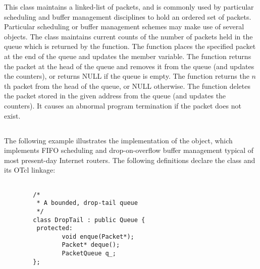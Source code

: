 This class maintains a linked-list of packets, and is commonly
used by particular scheduling and buffer management disciplines
to hold an ordered set of packets.
Particular scheduling or buffer management schemes may make
use of several  objects.
The  class maintains current counts of the number of
packets held in the queue which is returned by the 
function.
The  function places the specified packet at the end of
the queue and updates the  member variable.
The  function returns the packet at the head of the
queue and removes it from the queue (and updates the counters), or
returns NULL if the queue is empty.
The  function returns the $n$th packet from the head
of the queue, or NULL otherwise.
The  function deletes the packet stored in the given address
from the queue (and updates the counters).
It causes an abnormal program termination if the packet does not exist.

\subsection{}

The following example illustrates the implementation of the
 object,
which implements FIFO scheduling and
drop-on-overflow buffer management typical of most present-day
Internet routers.
The following definitions declare the class and its OTcl linkage:
\begin{small}
\begin{verbatim}

        /*
         * A bounded, drop-tail queue
         */
        class DropTail : public Queue {
         protected:
                void enque(Packet*);
                Packet* deque();
                PacketQueue q_;
        };

\end{verbatim}
\end{small}

